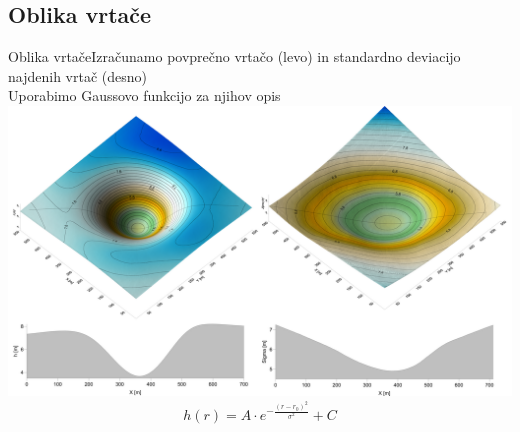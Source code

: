 \documentclass{beamer}
\begin{document}
\subsection{Oblika vrtače}

\begin{frame}{Oblika vrtače}{Izračunamo povprečno vrtačo (levo) in standardno deviacijo najdenih vrtač (desno)\\Uporabimo Gaussovo funkcijo za njihov opis}
  \includegraphics[width=\textwidth]{slike/menisija-vrtaca-sigma}
  \begin{equation} h(r) = A \cdot e^{-\frac{(r-r_0)^2}{\sigma^2}} + C \end{equation}
\end{frame}
\end{document}
